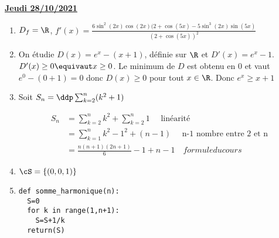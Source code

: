 \documentclass[a4paper, 11pt,reqno]{article}
\newcommand{\jour}[1]{
\begin{center}
\underline{\textbf{#1}}
\end{center}

 }
\begin{document}
\jour{Jeudi 28/10/2021}
\begin{correction}
\begin{enumerate}
\item $D_f= \R$, $f'(x) =\frac{6\sin^2(2x)\cos(2x) (2+\cos(5x) - 5\sin^3(2x)\sin(5x)}{(2+\cos(5x))^2}$
\item On étudie $D(x) = e^x-(x+1)$, définie sur $\R$ et $D'(x) = e^x-1$. 
$D'(x) \geq 0 \equivaut x\geq 0$. Le minimum de $D$ est obtenu en $0$ et vaut $e^0-(0+1)=0$ donc 
$D(x)\geq 0$ pour tout $x\in \R$. Donc $e^x \geq x+1$
\item Soit $S_n =\ddp  \sum_{k=2}^n (k^2+1)$

\begin{align*}
S_n& =\sum_{k=2}^n k^2+\sum_{k=2}^n 1 \quad \text{ linéarité}\\
	&=\sum_{k=1}^n k^2- 1^2 + (n-1)  \quad \text{ n-1 nombre entre 2 et n}\\
	&=\frac{n(n+1)(2n+1)}{6} -1  +n-1\quad { formule du cours}
\end{align*}


\item $\cS=\{ (0,0,1)\}$
\item 
\begin{lstlisting}
def somme_harmonique(n):
  S=0
  for k in range(1,n+1):
    S=S+1/k
  return(S)
\end{lstlisting}
\end{enumerate}
\end{correction} 
\end{document}
